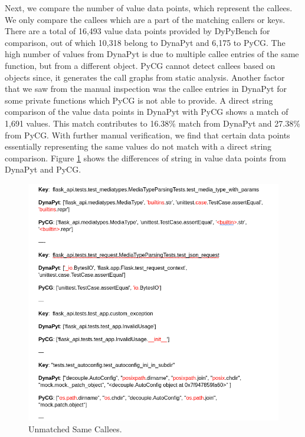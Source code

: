 Next, we compare the number of value data points, which represent the callees.
We only compare the callees which are a part of the matching callers or keys.
There are a total of 16,493 value data points provided by DyPyBench for comparison, out of which 10,318 belong to DynaPyt and 6,175 to PyCG.%
The high number of values from DynaPyt is due to multiple callee entries of the same function, but from a different object.
PyCG cannot detect callees based on objects since, it generates the call graphs from static analysis.
Another factor that we saw from the manual inspection was the callee entries in DynaPyt for some private functions which PyCG is not able to provide. 
A direct string comparison of the value data points in DynaPyt with PyCG shows a match of 1,691 values.
This match contributes to 16.38\% match from DynaPyt and 27.38\% from PyCG.
With further manual verification, we find that certain data points essentially representing the same values do not match with a direct string comparison.
Figure \ref{fig:unmatched_value_strings} shows the differences of string in value data points from DynaPyt and PyCG.
\begin{figure}[ht]
    \centering
    \includegraphics[width=0.8\linewidth]{figures/evaluation/string_compare.png}
    \caption[Unmatched Same Callees]{\label{fig:unmatched_value_strings}Unmatched Same Callees. }
\end{figure}

